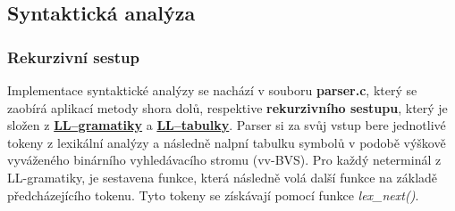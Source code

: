 \documentclass[a4paper, 12pt]{article} %
\begin{document}

        \subsection{Syntaktická analýza} \label{syntactics}
            \subsubsection{Rekurzivní sestup}
                Implementace syntaktické analýzy se nachází v souboru \textbf{parser.c}, který se
                zaobírá aplikací metody shora dolů, respektive \textbf{rekurzivního sestupu}, který
                je složen z \hyperref[llgramatika]{\textbf{LL--gramatiky}} a 
                \hyperref[lltabulka]{\textbf{LL--tabulky}}. Parser si za svůj vstup bere jednotlivé 
                tokeny z lexikální analýzy a následně nalpní tabulku symbolů v podobě výškově 
                vyváženého binárního vyhledávacího stromu (vv-BVS). Pro každý neterminál z 
                LL-gramatiky, je sestavena funkce, která následně volá další funkce na základě 
                předcházejícího tokenu. Tyto tokeny se získávají pomocí funkce \textit{lex\_next()}.
\end{document}
